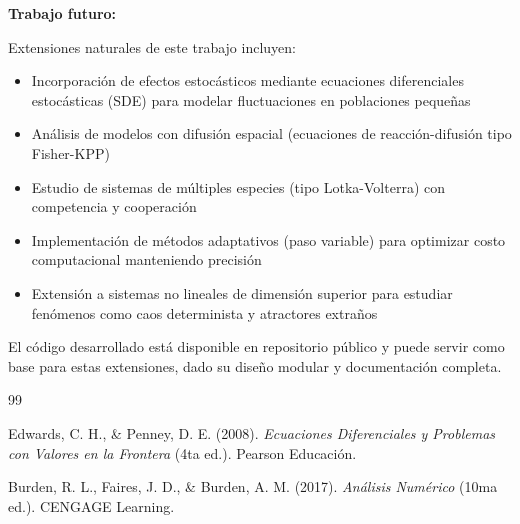 \documentclass[a4paper,10pt,twocolumn]{article}
\begin{document}
\textbf{Trabajo futuro:}

Extensiones naturales de este trabajo incluyen:

\begin{itemize}
    \item Incorporación de efectos estocásticos mediante ecuaciones diferenciales estocásticas (SDE) para modelar fluctuaciones en poblaciones pequeñas
    \item Análisis de modelos con difusión espacial (ecuaciones de reacción-difusión tipo Fisher-KPP)
    \item Estudio de sistemas de múltiples especies (tipo Lotka-Volterra) con competencia y cooperación
    \item Implementación de métodos adaptativos (paso variable) para optimizar costo computacional manteniendo precisión
    \item Extensión a sistemas no lineales de dimensión superior para estudiar fenómenos como caos determinista y atractores extraños
\end{itemize}

El código desarrollado está disponible en repositorio público y puede servir como base para estas extensiones, dado su diseño modular y documentación completa.



\begin{thebibliography}{99}

Edwards, C. H., \& Penney, D. E. (2008).
\textit{Ecuaciones Diferenciales y Problemas con Valores en la Frontera} (4ta ed.).
Pearson Educación.

Burden, R. L., Faires, J. D., \& Burden, A. M. (2017).
\textit{Análisis Numérico} (10ma ed.).
CENGAGE Learning.


\end{thebibliography}


\label{end}
\end{document}
